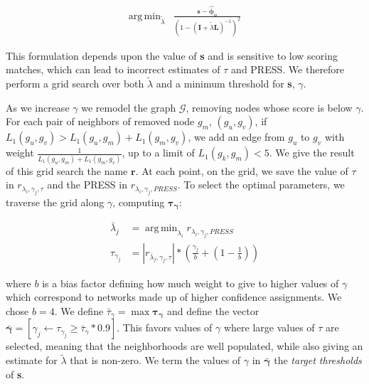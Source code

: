 \documentclass{article}
\DeclareMathOperator*{\argmin}{arg\,min}
\begin{document}
    \begin{align}
        \argmin_{\tilde \lambda} & \frac{\mathbf{s - {\hat \phi_o}}}{\left(
            1 - \left(
                \mathbf{I} + {\tilde \lambda}\mathbf{L}
            \right)^{-1}
        \right)^2}
    \end{align}

        This formulation depends upon the value of \textbf{s} and is
    sensitive to low scoring matches, which can lead to incorrect
    estimates of $\tau$ and PRESS. We therefore perform a grid
    search over both ${\tilde \lambda}$ and a minimum threshold
    for \textbf{s}, $\gamma$.

        As we increase $\gamma$ we remodel the graph $\mathcal{G}$,
    removing nodes whose score is below $\gamma$. For each pair
    of neighbors of removed node $g_m$, $(g_u, g_v)$, if
    $L_1(g_u, g_v) >  L_1(g_u, g_m) + L_1(g_m, g_v)$, we add an
    edge from $g_u$ to $g_v$ with weight $\frac{1}{L_1(g_u, g_m)
    + L_1(g_m, g_v)}$, up to a limit of $L_1(g_k, g_m) < 5$.
    We give the result of this grid search the name $\mathbf{r}$.
    At each point, on the grid, we save the value of $\tau$ in
    $r_{\lambda_i, \gamma_j, \tau}$ and the PRESS in $r_{
    \lambda_i, \gamma_j, PRESS}$. To select the optimal parameters,
    we traverse the grid along $\gamma$, computing $\mathbf{\tau_\gamma}$:

    \begin{align}
        {\bar \lambda_j} &= \argmin_{\lambda_i}{r_{\lambda_i, \gamma_j, PRESS}} \\
        \tau_{\gamma_j} &= |r_{{\bar \lambda_j}, \gamma_j, \tau}| * \left(
            \frac{\gamma_j}{b} + (1 - \frac{1}{b})\right)
    \end{align}

    \noindent where $b$ is a bias factor defining how much
    weight to give to higher values of $\gamma$ which
    correspond to networks made up of higher confidence
    assignments. We chose $b = 4$. We define ${\bar \tau_\gamma} =
    \max{\mathbf{\tau_\gamma}}$ and define the  vector
    $\mathbf{\bar \gamma} = \left[\gamma_j \leftarrow\tau_{\gamma_j}
    \ge {\bar \tau_\gamma} * 0.9\right]$. This favors values of
    $\gamma$ where large values of $\tau$ are selected, meaning that
    the neighborhoods are well populated, while also giving an estimate
    for ${\tilde \lambda}$ that is non-zero. We term the values of
    $\gamma$ in $\mathbf{{\bar \gamma}}$ the {\em target thresholds}
    of \textbf{s}.
\end{document}

